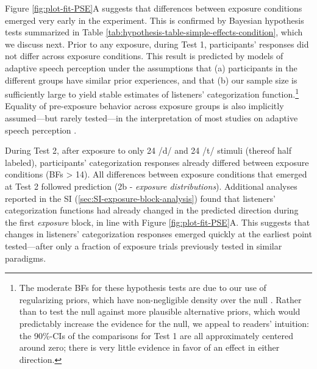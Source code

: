 \documentclass[
  11pt,
  man,mask,floatsintext]{apa6}
\begin{document}
Figure \ref{fig:plot-fit-PSE}A suggests that differences between exposure conditions emerged very early in the experiment. This is confirmed by Bayesian hypothesis tests summarized in Table \ref{tab:hypothesis-table-simple-effects-condition}, which we discuss next. Prior to any exposure, during Test 1, participants' responses did not differ across exposure conditions. This result is predicted by models of adaptive speech perception under the assumptions that (a) participants in the different groups have similar prior experiences, and that (b) our sample size is sufficiently large to yield stable estimates of listeners' categorization function.\footnote{ The moderate BFs for these hypothesis tests are due to our use of regularizing priors, which have non-negligible density over the null \autocite[for an introduction to the Savage-Dickey method, see][]{wagenmakers2010}. Rather than to test the null against more plausible alternative priors, which would predictably increase the evidence for the null, we appeal to readers' intuition: the 90\%-CIs of the comparisons for Test 1 are all approximately centered around zero; there is very little evidence in favor of an effect in either direction.} Equality of pre-exposure behavior across exposure groups is also implicitly assumed---but rarely tested---in the interpretation of most studies on adaptive speech perception \autocite[when it is tested, it often turns out that this assumption is \emph{not} necessarily warranted, presumably due to insufficient sample sizes, cf.][]{kleinschmidt2020}.

During Test 2, after exposure to only 24 /d/ and 24 /t/ stimuli (thereof half labeled), participants' categorization responses already differed between exposure conditions (BFs \textgreater{} 14). All differences between exposure conditions that emerged at Test 2 followed prediction (2b - \emph{exposure distributions}). Additional analyses reported in the SI (\ref{sec:SI-exposure-block-analysis}) found that listeners' categorization functions had already changed in the predicted direction during the first \emph{exposure} block, in line with Figure \ref{fig:plot-fit-PSE}A. This suggests that changes in listeners' categorization responses emerged quickly at the earliest point tested---after only a fraction of exposure trials previously tested in similar paradigms.
\end{document}
